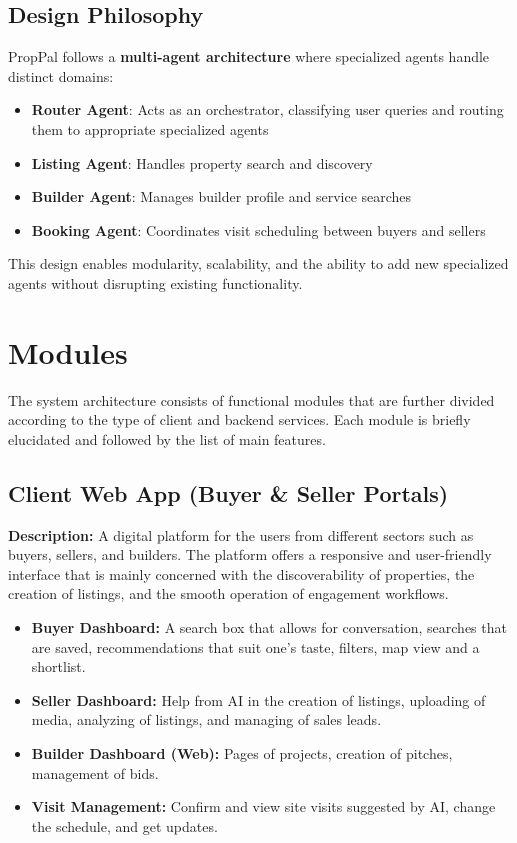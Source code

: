 \subsection{Design Philosophy}

PropPal follows a \textbf{multi-agent architecture} where specialized agents handle distinct domains:

\begin{itemize}
    \item \textbf{Router Agent}: Acts as an orchestrator, classifying user queries and routing them to appropriate specialized agents
    \item \textbf{Listing Agent}: Handles property search and discovery
    \item \textbf{Builder Agent}: Manages builder profile and service searches
    \item \textbf{Booking Agent}: Coordinates visit scheduling between buyers and sellers
\end{itemize}

This design enables modularity, scalability, and the ability to add new specialized agents without disrupting existing functionality.

\section{Modules}

The system architecture consists of functional modules that are further divided according to the type of client and backend services. Each module is briefly elucidated and followed by the list of main features.

\subsection{Client Web App (Buyer \& Seller Portals)}

\textbf{Description:} A digital platform for the users from different sectors such as buyers, sellers, and builders. The platform offers a responsive and user-friendly interface that is mainly concerned with the discoverability of properties, the creation of listings, and the smooth operation of engagement workflows.

\begin{itemize}
    \item \textbf{Buyer Dashboard:} A search box that allows for conversation, searches that are saved, recommendations that suit one's taste, filters, map view and a shortlist.
    \item \textbf{Seller Dashboard:} Help from AI in the creation of listings, uploading of media, analyzing of listings, and managing of sales leads.
    \item \textbf{Builder Dashboard (Web):} Pages of projects, creation of pitches, management of bids.
    \item \textbf{Visit Management:} Confirm and view site visits suggested by AI, change the schedule, and get updates.
\end{itemize}

